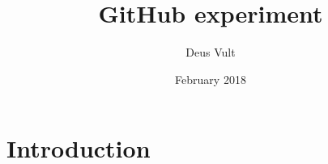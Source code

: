 \documentclass{article}
\title{GitHub experiment}
\author{Deus Vult}
\date{February 2018}
\begin{document}
\maketitle

\section{Introduction}
\end{document}
